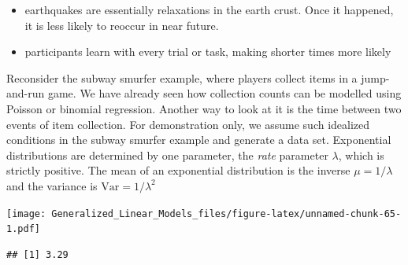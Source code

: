 \documentclass[]{svmono}
\newenvironment{Shaded}{\begin{snugshade}}{\end{snugshade}}
\newcommand{\KeywordTok}[1]{\textcolor[rgb]{0.13,0.29,0.53}{\textbf{#1}}}
\newcommand{\DataTypeTok}[1]{\textcolor[rgb]{0.13,0.29,0.53}{#1}}
\newcommand{\DecValTok}[1]{\textcolor[rgb]{0.00,0.00,0.81}{#1}}
\newcommand{\StringTok}[1]{\textcolor[rgb]{0.31,0.60,0.02}{#1}}
\newcommand{\OperatorTok}[1]{\textcolor[rgb]{0.81,0.36,0.00}{\textbf{#1}}}
\newcommand{\NormalTok}[1]{#1}
\providecommand{\tightlist}{%
  \setlength{\itemsep}{0pt}\setlength{\parskip}{0pt}}
\theoremstyle{definition}
\theoremstyle{definition}
\theoremstyle{definition}
\theoremstyle{remark}
\begin{document}
\begin{itemize}
\tightlist
\item
  earthquakes are essentially relaxations in the earth crust. Once it
  happened, it is less likely to reoccur in near future.
\item
  participants learn with every trial or task, making shorter times more
  likely
\end{itemize}

Reconsider the subway smurfer example, where players collect items in a
jump-and-run game. We have already seen how collection counts can be
modelled using Poisson or binomial regression. Another way to look at it
is the time between two events of item collection. For demonstration
only, we assume such idealized conditions in the subway smurfer example
and generate a data set. Exponential distributions are determined by one
parameter, the \emph{rate} parameter \(\lambda\), which is strictly
positive. The mean of an exponential distribution is the inverse
\(\mu = 1/\lambda\) and the variance is \(\textrm{Var} = 1/\lambda^2\)

\begin{Shaded}
\end{Shaded}

\texttt{[image: Generalized\_Linear\_Models\_files/figure-latex/unnamed-chunk-65-1.pdf]}

\begin{Shaded}
\end{Shaded}

\begin{verbatim}
## [1] 3.29
\end{verbatim}
\end{document}

